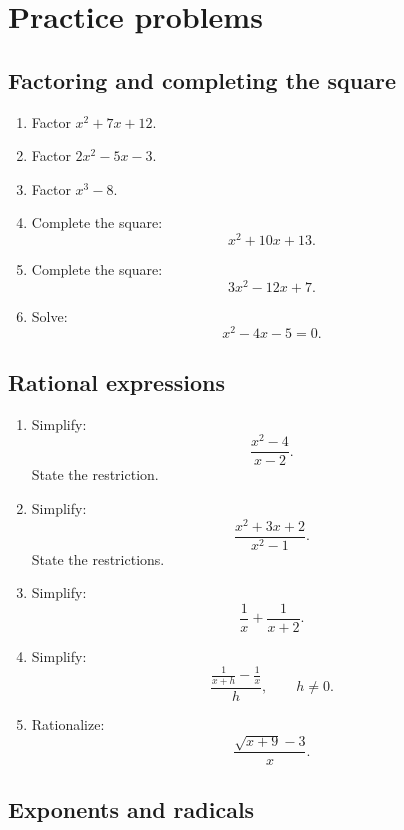 \section{Practice problems}
\label{appsec:algebra-practice-problems}

\subsection*{Factoring and completing the square}

\begin{enumerate}
\item Factor \(x^2+7x+12\).

\item Factor \(2x^2-5x-3\).

\item Factor \(x^3-8\).

\item Complete the square:
\[
x^2+10x+13.
\]

\item Complete the square:
\[
3x^2-12x+7.
\]

\item Solve:
\[
x^2-4x-5=0.
\]
\end{enumerate}

\subsection*{Rational expressions}

\begin{enumerate}
\item Simplify:
\[
\frac{x^2-4}{x-2}.
\]
State the restriction.

\item Simplify:
\[
\frac{x^2+3x+2}{x^2-1}.
\]
State the restrictions.

\item Simplify:
\[
\frac{1}{x}+\frac{1}{x+2}.
\]

\item Simplify:
\[
\frac{\frac1{x+h}-\frac1x}{h},
\qquad h\neq0.
\]

\item Rationalize:
\[
\frac{\sqrt{x+9}-3}{x}.
\]
\end{enumerate}

\subsection*{Exponents and radicals}

